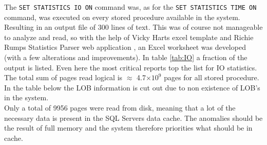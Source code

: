 \documentclass{cslthse-msc}
\begin{document}
The \texttt{SET STATISTICS IO ON} command was, as for the \texttt{SET STATISTICS TIME ON} command, was executed on every stored procedure available in the system. Resulting in an output file of 300 lines of text. This was of course not manageable to analyze and read, so with the help of Vicky Harts excel template    \cite{Vicky} and Richie Rumps Statistics Parser web application    \cite{Rump}, an Excel worksheet was developed (with a few alterations and improvements). In table \ref{tab:IO} a fraction of the output is listed. Even here the most critical reports top the list for IO statistics. The total sum of pages read logical is $\approx$ 4.7$\times 10^9$ pages for all stored procedure. In the table below the LOB information is cut out due to non existence of LOB's in the system.\\ Only a total of 9956 pages were read from disk, meaning that a lot of the necessary data is present in the SQL Servers data cache. The anomalies should be the result of full memory and the system therefore priorities what should be in cache. 
\end{document}
